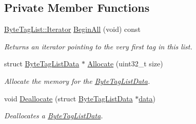 \subsection*{Private Member Functions}
\begin{DoxyCompactItemize}
\item 
\hyperlink{classns3_1_1ByteTagList_1_1Iterator}{Byte\+Tag\+List\+::\+Iterator} \hyperlink{classns3_1_1ByteTagList_ac4f33846ef6a84a64ede38b2de1564ba}{Begin\+All} (void) const 
\begin{DoxyCompactList}\small\item\em Returns an iterator pointing to the very first tag in this list. \end{DoxyCompactList}\item 
struct \hyperlink{structns3_1_1ByteTagListData}{Byte\+Tag\+List\+Data} $\ast$ \hyperlink{classns3_1_1ByteTagList_a6a23e438aeb894ea188a0ada84437073}{Allocate} (uint32\+\_\+t size)
\begin{DoxyCompactList}\small\item\em Allocate the memory for the \hyperlink{structns3_1_1ByteTagListData}{Byte\+Tag\+List\+Data}. \end{DoxyCompactList}\item 
void \hyperlink{classns3_1_1ByteTagList_aebe6943177a3ce90f7fa16188e67f650}{Deallocate} (struct \hyperlink{structns3_1_1ByteTagListData}{Byte\+Tag\+List\+Data} $\ast$\hyperlink{topology-example-sim_8cc_a26c65296e316af77b787dc77469bb2a4}{data})
\begin{DoxyCompactList}\small\item\em Deallocates a \hyperlink{structns3_1_1ByteTagListData}{Byte\+Tag\+List\+Data}. \end{DoxyCompactList}\end{DoxyCompactItemize}
